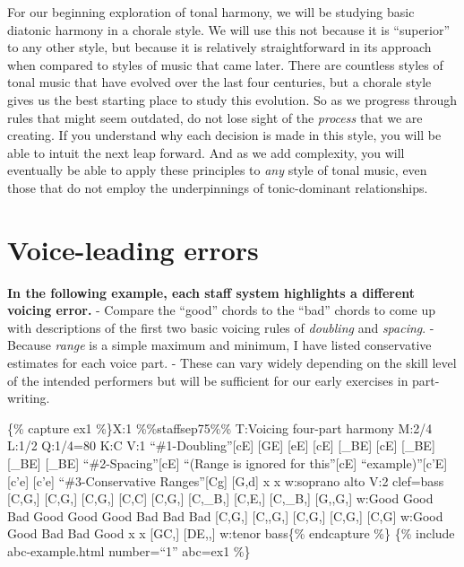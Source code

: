 \documentclass{book}
\begin{document}
For our beginning exploration of tonal harmony, we will be studying basic
diatonic harmony in a chorale style. We will use this not because it is
``superior'' to any other style, but because it is relatively straightforward
in its approach when compared to styles of music that came later. There are
countless styles of tonal music that have evolved over the last four
centuries, but a chorale style gives us the best starting place to study this
evolution. So as we progress through rules that might seem outdated, do not
lose sight of the \emph{process} that we are creating. If you understand why
each decision is made in this style, you will be able to intuit the next leap
forward. And as we add complexity, you will eventually be able to apply these
principles to \emph{any} style of tonal music, even those that do not employ
the underpinnings of tonic-dominant relationships.

\hypertarget{voice-leading-errors}{%
\section{Voice-leading errors}\label{voice-leading-errors}}

\textbf{In the following example, each staff system highlights a different
voicing error.} - Compare the ``good'' chords to the ``bad'' chords to come up
with descriptions of the first two basic voicing rules of \emph{doubling} and
\emph{spacing}. - Because \emph{range} is a simple maximum and minimum, I have
listed conservative estimates for each voice part. - These can vary widely
depending on the skill level of the intended performers but will be sufficient
for our early exercises in part-writing.

\{\% capture ex1 \%\}X:1 \%\%staffsep75\%\% T:Voicing four-part harmony M:2/4
L:1/2 Q:1/4=80 K:C V:1 ``\#1-Doubling''{[}cE{]} {[}GE{]} {[}eE{]}
{[}cE{]}\textbar\textbar{} {[}\_BE{]} {[}cE{]} {[}\_BE{]} {[}\_BE{]}
{[}\_BE{]}\textbar{]} ``\#2-Spacing''{[}cE{]} ``(Range is ignored for
this''{[}cE{]} ``example)''{[}c'E{]} {[}c'e{]} {[}c'e{]}\textbar{]}
``\#3-Conservative Ranges''{[}Cg{]}\textbar{} {[}G,d{]}\textbar{} x\textbar{}
x\textbar{]} w:soprano alto V:2 clef=bass {[}C,G,{]} {[}C,G,{]} {[}C,G,{]}
{[}C,C{]}\textbar\textbar{} {[}C,G,{]} {[}C,\_B,{]} {[}C,E,{]} {[}C,\_B,{]}
{[}G,,G,{]}\textbar{]} w:Good Good Bad Good Good Good Bad Bad Bad {[}C,G,{]}
{[}C,,G,{]} {[}C,G,{]} {[}C,G,{]} {[}C,G{]}\textbar{]} w:Good Good Bad Bad
Good x\textbar{} x\textbar{} {[}GC,{]}\textbar{} {[}DE,,{]}\textbar{]} w:tenor
bass\{\% endcapture \%\} \{\% include abc-example.html number=``1'' abc=ex1
\%\}
\end{document}
